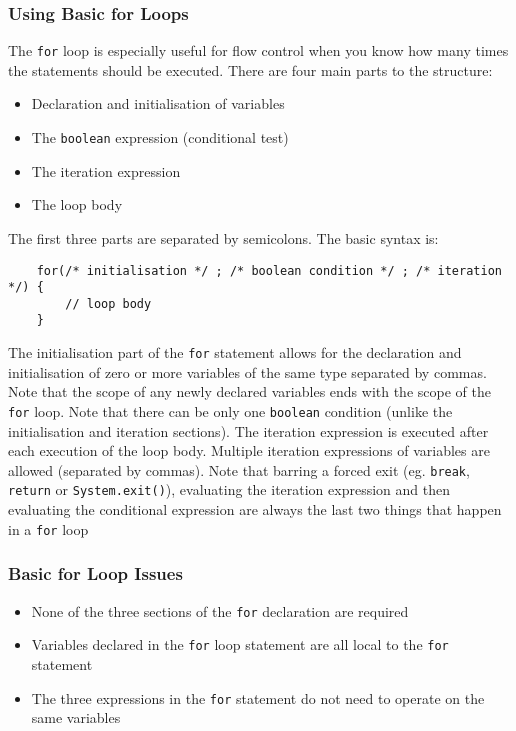 \subsubsection{Using Basic for Loops}
The \verb#for# loop is especially useful for flow control when you know how 
many times the statements should be executed. There are four main parts to the 
structure:
\begin{itemize}
    \item Declaration and initialisation of variables
    \item The \verb#boolean# expression (conditional test)
    \item The iteration expression
    \item The loop body
\end{itemize}
The first three parts are separated by semicolons. The basic syntax is:
\begin{verbatim}
    for(/* initialisation */ ; /* boolean condition */ ; /* iteration */) {
        // loop body
    }
\end{verbatim}
The initialisation part of the \verb#for# statement allows for the declaration 
and initialisation of zero or more variables of the same type separated by 
commas. Note that the scope of any newly declared variables ends with the scope 
of the \verb#for# loop. Note that there can be only one \verb#boolean# 
condition (unlike the initialisation and iteration sections). The iteration 
expression is executed after each execution of the loop body. Multiple 
iteration expressions of variables are allowed (separated by commas). Note that 
barring a forced exit (eg. \verb#break#, \verb#return# or 
\verb#System.exit()#), evaluating the iteration expression and then evaluating 
the conditional expression are always the last two things that happen in a 
\verb#for# loop

\subsubsection{Basic for Loop Issues}
\begin{itemize}
    \item None of the three sections of the \verb#for# declaration are required
    \item Variables declared in the \verb#for# loop statement are all local to 
    the \verb#for# statement
    \item The three expressions in the \verb#for# statement do not need to 
    operate on the same variables
\end{itemize}

